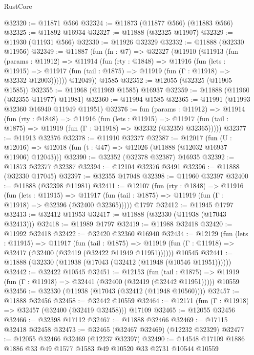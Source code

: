 \begin{lexlean}{RustCore}
\begin{coremodule}
@32320 := @11871 @566
@32324 := @11873 (@11877 @566) (@11883 @566)
@32325 := @11892 @16934
@32327 := @11888 (@32325 @11907)
@32329 := @11930 (@11931 @566)
@32330 := @11926 @32329
@32332 := @11888 (@32330 @11956)
@32349 := @11887
    (fun (fn : @7) =>
    @32327
      (@11910
        (@11913
          (fun (params : @11912) =>
          @11914
            (fun (rty : @1848) =>
            @11916
              (fun (lets : @11915) =>
              @11917 (fun (tail : @1875) => @11919 (fun (Γ : @11918) => @32332 @12003))))))
        @12049))
    @1585
@32352 := @12055 (@32325 (@11905 @1585))
@32355 := @11968 (@11969 @1585) @16937
@32359 := @11888 (@11960 (@32355 @11977) @11981)
@32360 := @11994 @1585
@32365 := @11991 (@11993 @32360 @16940 @11949 @11951)
@32376 := fun (params : @11912) =>
  @11914
    (fun (rty : @1848) =>
    @11916
      (fun (lets : @11915) =>
      @11917 (fun (tail : @1875) => @11919 (fun (Γ : @11918) => @32332 (@32359 @32365)))))
@32377 := @11913 @32376
@32378 := @11910 @32377
@32387 := @12017
    (fun (U : @12016) => @12018 (fun (t : @47) => @12026 (@11888 (@12032 @16937 @11906) @12043)))
@32390 := @32352 (@32378 @32387) @16935
@32392 := @11873 @32377 @32387
@32394 := @12104 @32376 @3491
@32396 := @11888 (@32330 @17045)
@32397 := @32355 @17048
@32398 := @11960 @32397
@32400 := @11888 (@32398 @11981)
@32411 := @12107
    (fun (rty : @1848) =>
    @11916
      (fun (lets : @11915) =>
      @11917 (fun (tail : @1875) => @11919 (fun (Γ : @11918) => @32396 (@32400 @32365)))))
    @1797
@32412 := @11945 @1797
@32413 := @32412 @11953
@32417 := @11888 (@32330 (@11938 (@17043 @32413)))
@32418 := @11989 @1797
@32419 := @11988 @32418
@32420 := @11992 @32418
@32422 := @32420 @32360 @16940
@32434 := @12129
    (fun (lets : @11915) =>
    @11917
      (fun (tail : @1875) =>
      @11919 (fun (Γ : @11918) => @32417 (@32400 (@32419 (@32422 @11949 @11951))))))
    @10545
@32441 := @11888 (@32330 (@11938 (@17043 (@32412 (@11948 (@10546 @11951))))))
@32442 := @32422 @10545
@32451 := @12153
    (fun (tail : @1875) => @11919 (fun (Γ : @11918) => @32441 (@32400 (@32419 (@32442 @11951)))))
    @10559
@32456 := @32330 (@11938 (@17043 (@32412 (@11948 @10560))))
@32457 := @11888 @32456
@32458 := @32442 @10559
@32464 := @12171 (fun (Γ : @11918) => @32457 (@32400 (@32419 @32458))) @17109
@32465 := @12055 @32456
@32466 := @32398 @17112
@32467 := @11888 @32466
@32469 := @17115 @32418 @32458
@32473 := @32465 (@32467 @32469) (@12232 @32329)
@32477 := @12055 @32466 @32469 (@12237 @32397)
@32490 := @14548 @17109 @1886 @1886 @33 @49 @1577 @1583 @49 @10520 @33 @2731 @10544 @10559

\end{coremodule}
\end{lexlean}
